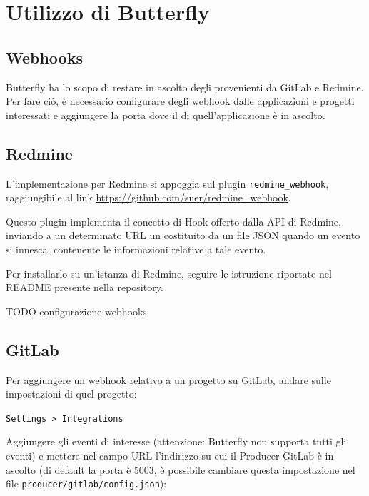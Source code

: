 \section{Utilizzo di Butterfly}\label{utilizzo}


\subsection{Webhooks} %

Butterfly ha lo scopo di restare in ascolto degli  provenienti da GitLab e Redmine.
Per fare ciò, è necessario configurare degli webhook dalle applicazioni e progetti interessati e aggiungere
la porta dove il  di quell'applicazione è in ascolto.


\subsection{Redmine}

L'implementazione per Redmine si appoggia sul plugin \texttt{redmine\_webhook}, raggiungibile al link
\url{https://github.com/suer/redmine_webhook}.

Questo plugin implementa il concetto di Hook offerto dalla API di Redmine, inviando a un determinato URL
un  costituito da un file JSON quando un evento si innesca, contenente le informazioni relative
a tale evento.

Per installarlo su un'istanza di Redmine, seguire le istruzione riportate nel README presente nella repository.

TODO configurazione webhooks


\subsection{GitLab}

Per aggiungere un webhook relativo a un progetto su GitLab, andare sulle impostazioni di quel progetto:

\begin{center}
    \texttt{Settings > Integrations}
\end{center}

Aggiungere gli eventi di interesse (attenzione: Butterfly non supporta tutti gli eventi) e mettere nel campo URL l'indirizzo su cui il Producer GitLab è in ascolto (di default la porta è 5003, è possibile cambiare questa impostazione
nel file \texttt{producer/gitlab/config.json}): %

